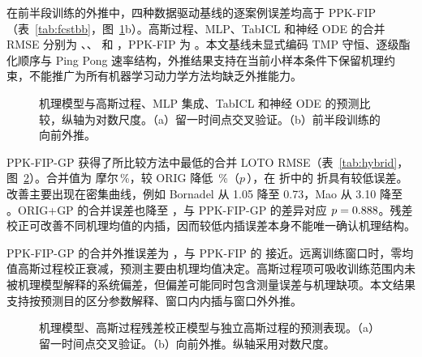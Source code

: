 在前半段训练的外推中，四种数据驱动基线的逐案例误差均高于 PPK-FIP（表~\ref{tab:fcstbb}，图~\ref{fig:blackbox}b）。高斯过程、MLP、TabICL 和神经 ODE 的合并 RMSE 分别为 \FcstBBGP、\FcstBBMLP、\FcstBBTabICL{} 和 \FcstBBNODE，PPK-FIP 为 \FcstAllNew。本文基线未显式编码 TMP 守恒、逐级酯化顺序与 Ping Pong 速率结构，外推结果支持在当前小样本条件下保留机理约束，不能推广为所有机器学习动力学方法均缺乏外推能力。
\begin{figure}[!htbp]\centering{}\caption{机理模型与高斯过程、MLP 集成、TabICL 和神经 ODE 的预测比较，纵轴为对数尺度。（a）留一时间点交叉验证。（b）前半段训练的向前外推。}\label{fig:blackbox}\end{figure}

PPK-FIP-GP 获得了所比较方法中最低的合并 LOTO RMSE（表~\ref{tab:hybrid}，图~\ref{fig:hybrid}）。合并值为 \HybLotoAll{} 摩尔\,\%，较 ORIG 降低 \HybLotoRedOrig\,\%（$p$\,\HybLotoPOrig），在 \FoldN{} 折中的 \FoldHybWinsOrig{} 折具有较低误差。改善主要出现在密集曲线，例如 Bornadel 从 1.05 降至 0.73，Mao 从 3.10 降至 \HybLotoMao。ORIG+GP 的合并误差也降至 \HybLotoOrigGP，与 PPK-FIP-GP 的差异对应 $p=0.888$。残差校正可改善不同机理均值的内插，因而较低内插误差本身不能唯一确认机理结构。

PPK-FIP-GP 的合并外推误差为 \HybFcstAll，与 PPK-FIP 的 \HybFcstBase{} 接近。远离训练窗口时，零均值高斯过程校正衰减，预测主要由机理均值决定。高斯过程项可吸收训练范围内未被机理模型解释的系统偏差，但偏差可能同时包含测量误差与机理缺项。本文结果支持按预测目的区分参数解释、窗口内内插与窗口外外推。
\begin{figure}[!htbp]\centering{}\caption{机理模型、高斯过程残差校正模型与独立高斯过程的预测表现。（a）留一时间点交叉验证。（b）向前外推。纵轴采用对数尺度。}\label{fig:hybrid}\end{figure}
